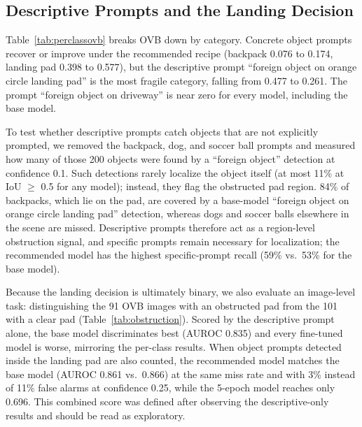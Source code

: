 \documentclass[conf]{new-aiaa}
\begin{document}
\subsection{Descriptive Prompts and the Landing Decision}

Table~\ref{tab:perclassovb} breaks OVB down by category. Concrete object prompts recover or
improve under the recommended recipe (backpack 0.076 to 0.174, landing pad 0.398 to 0.577),
but the descriptive prompt ``foreign object on orange circle landing pad'' is the most fragile
category, falling from 0.477 to 0.261. The prompt ``foreign object on driveway'' is near zero
for every model, including the base model.

To test whether descriptive prompts catch objects that are not explicitly prompted, we
removed the backpack, dog, and soccer ball prompts and measured how many of those 200 objects
were found by a ``foreign object'' detection at confidence 0.1. Such detections rarely
localize the object itself (at most 11\% at IoU $\geq$ 0.5 for any model); instead, they flag the
obstructed pad region. 84\% of backpacks, which lie on the pad, are covered by a base-model
``foreign object on orange circle landing pad'' detection, whereas dogs and soccer balls
elsewhere in the scene are missed. Descriptive prompts therefore act as a region-level
obstruction signal, and specific prompts remain necessary for localization; the recommended
model has the highest specific-prompt recall (59\% vs.\ 53\% for the base model).

Because the landing decision is ultimately binary, we also evaluate an image-level task:
distinguishing the 91 OVB images with an obstructed pad from the 101 with a clear pad
(Table~\ref{tab:obstruction}). Scored by the descriptive prompt alone, the base model
discriminates best (AUROC 0.835) and every fine-tuned model is worse, mirroring the per-class
results. When object prompts detected inside the landing pad are also counted, the
recommended model matches the base model (AUROC 0.861 vs.\ 0.866) at the same miss rate and
with 3\% instead of 11\% false alarms at confidence 0.25, while the 5-epoch model reaches only
0.696. This combined score was defined after observing the descriptive-only results and should
be read as exploratory.
\end{document}
